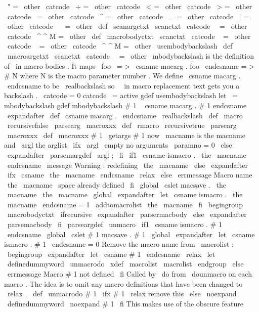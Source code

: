 {{{\
"
=
\
other
\
catcode
\
+
=
\
other
\
catcode
\
<
=
\
other
\
catcode
\
>
=
\
other
\
catcode
\
=
\
other
\
catcode
\
^
=
\
other
\
catcode
\
_
=
\
other
\
catcode
\
|
=
\
other
\
catcode
\
~
=
\
other
}
\
def
\
scanargctxt
{
%
\
scanctxt
\
catcode
\
\
=
\
other
\
catcode
\
^
^
M
=
\
other
}
\
def
\
macrobodyctxt
{
%
\
scanctxt
\
catcode
\
{
=
\
other
\
catcode
\
}
=
\
other
\
catcode
\
^
^
M
=
\
other
\
usembodybackslash
}
\
def
\
macroargctxt
{
%
\
scanctxt
\
catcode
\
\
=
\
other
}
%
\
mbodybackslash
is
the
definition
of
\
in
macro
bodies
.
%
It
maps
\
foo
\
=
>
\
csname
macarg
.
foo
\
endcsname
=
>
#
N
%
where
N
is
the
macro
parameter
number
.
%
We
define
\
csname
macarg
.
\
endcsname
to
be
\
realbackslash
so
%
\
\
in
macro
replacement
text
gets
you
a
backslash
.
{
\
catcode
=
0
catcode
\
=
active
gdef
usembodybackslash
{
let
\
=
mbodybackslash
}
gdef
mbodybackslash
#
1
\
{
csname
macarg
.
#
1
endcsname
}
}
\
expandafter
\
def
\
csname
macarg
.
\
endcsname
{
\
realbackslash
}
\
def
\
macro
{
\
recursivefalse
\
parsearg
\
macroxxx
}
\
def
\
rmacro
{
\
recursivetrue
\
parsearg
\
macroxxx
}
\
def
\
macroxxx
#
1
{
%
\
getargs
{
#
1
}
%
now
\
macname
is
the
macname
and
\
argl
the
arglist
\
ifx
\
argl
\
empty
%
no
arguments
\
paramno
=
0
%
\
else
\
expandafter
\
parsemargdef
\
argl
;
%
\
fi
\
if1
\
csname
ismacro
.
\
the
\
macname
\
endcsname
\
message
{
Warning
:
redefining
\
the
\
macname
}
%
\
else
\
expandafter
\
ifx
\
csname
\
the
\
macname
\
endcsname
\
relax
\
else
\
errmessage
{
Macro
name
\
the
\
macname
\
space
already
defined
}
\
fi
\
global
\
cslet
{
macsave
.
\
the
\
macname
}
{
\
the
\
macname
}
%
\
global
\
expandafter
\
let
\
csname
ismacro
.
\
the
\
macname
\
endcsname
=
1
%
\
addtomacrolist
{
\
the
\
macname
}
%
\
fi
\
begingroup
\
macrobodyctxt
\
ifrecursive
\
expandafter
\
parsermacbody
\
else
\
expandafter
\
parsemacbody
\
fi
}
\
parseargdef
\
unmacro
{
%
\
if1
\
csname
ismacro
.
#
1
\
endcsname
\
global
\
cslet
{
#
1
}
{
macsave
.
#
1
}
%
\
global
\
expandafter
\
let
\
csname
ismacro
.
#
1
\
endcsname
=
0
%
%
Remove
the
macro
name
from
\
macrolist
:
\
begingroup
\
expandafter
\
let
\
csname
#
1
\
endcsname
\
relax
\
let
\
definedummyword
\
unmacrodo
\
xdef
\
macrolist
{
\
macrolist
}
%
\
endgroup
\
else
\
errmessage
{
Macro
#
1
not
defined
}
%
\
fi
}
%
Called
by
\
do
from
\
dounmacro
on
each
macro
.
The
idea
is
to
omit
any
%
macro
definitions
that
have
been
changed
to
\
relax
.
%
\
def
\
unmacrodo
#
1
{
%
\
ifx
#
1
\
relax
%
remove
this
\
else
\
noexpand
\
definedummyword
\
noexpand
#
1
%
\
fi
}
%
This
makes
use
of
the
obscure
feature
}}
